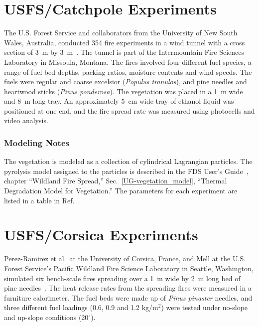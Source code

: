 \section{USFS/Catchpole Experiments}
\label{USFS_Catchpole_Description}

The U.S. Forest Service and collaborators from the University of New South Wales, Australia, conducted 354 fire experiments in a wind tunnel with a cross section of 3~m by 3~m~\cite{Catchpole:CST1998}. The tunnel is part of the Intermountain Fire Sciences Laboratory in Missoula, Montana. The fires involved four different fuel species, a range of fuel bed depths, packing ratios, moisture contents and wind speeds. The fuels were regular and coarse excelsior ({\em Populus tranulos}), and pine needles and heartwood sticks ({\em Pinus ponderosa}). The vegetation was placed in a 1~m wide and 8~m long tray. An approximately 5~cm wide tray of ethanol liquid was positioned at one end, and the fire spread rate was measured using photocells and video analysis.

\subsubsection{Modeling Notes}

The vegetation is modeled as a collection of cylindrical Lagrangian particles. The pyrolysis model assigned to the particles is described in the FDS User's Guide~\cite{FDS_Users_Guide}, chapter ``Wildland Fire Spread,'' Sec.~\ref{UG-vegetation_model}, ``Thermal Degradation Model for Vegetation.'' The parameters for each experiment are listed in a table in Ref.~\cite{Catchpole:CST1998}.


\section{USFS/Corsica Experiments}
\label{USFS_Corsica_Description}

Perez-Ramirez et al.~at the University of Corsica, France, and Mell at the U.S. Forest Service's Pacific Wildland Fire Science Laboratory in Seattle, Washington, simulated six bench-scale fires spreading over a 1~m wide by 2~m long bed of pine needles~\cite{Perez-Ramirez:FT2017}. The heat release rates from the spreading fires were measured in a furniture calorimeter. The fuel beds were made up of {\em Pinus pinaster} needles, and three different fuel loadings (0.6, 0.9 and 1.2 kg/m$^2$) were tested under no-slope and up-slope conditions (20$^\circ$).

